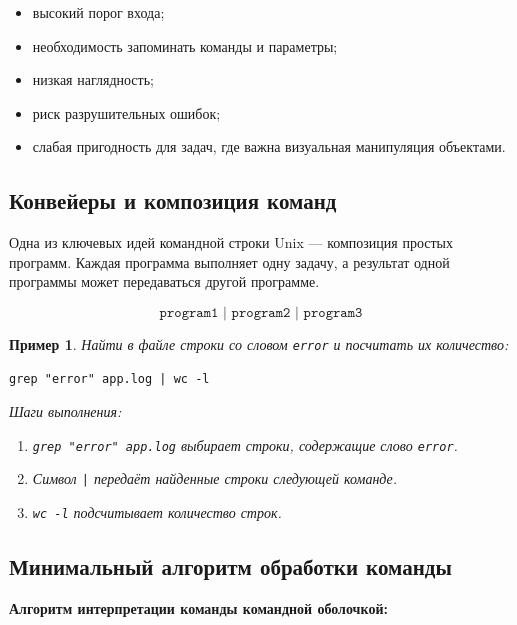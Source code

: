 \documentclass[12pt,a4paper]{article}
\newtheorem{example}{Пример}
\begin{document}
\begin{itemize}
    \item высокий порог входа;
    \item необходимость запоминать команды и параметры;
    \item низкая наглядность;
    \item риск разрушительных ошибок;
    \item слабая пригодность для задач, где важна визуальная манипуляция объектами.
\end{itemize}

\subsection{Конвейеры и композиция команд}

Одна из ключевых идей командной строки Unix --- композиция простых программ. Каждая программа выполняет одну задачу, а результат одной программы может передаваться другой программе.

\[
\texttt{program1 | program2 | program3}
\]

\begin{example}
Найти в файле строки со словом \texttt{error} и посчитать их количество:
\begin{lstlisting}
grep "error" app.log | wc -l
\end{lstlisting}

Шаги выполнения:
\begin{enumerate}
    \item \texttt{grep "error" app.log} выбирает строки, содержащие слово \texttt{error}.
    \item Символ \texttt{|} передаёт найденные строки следующей команде.
    \item \texttt{wc -l} подсчитывает количество строк.
\end{enumerate}
\end{example}

\subsection{Минимальный алгоритм обработки команды}

\textbf{Алгоритм интерпретации команды командной оболочкой:}
\end{document}
